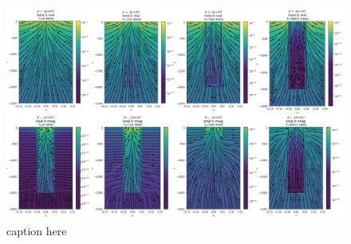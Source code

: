 \begin{figure}[htb]
    \begin{center}
    \includegraphics[width=\columnwidth]{figures/casing_software/magnetic_flux_density_sigma.png}
    \end{center}
\caption{caption here}
\label{fig:magnetic_flux_density_sigma}
\end{figure}
